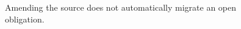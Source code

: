 \begin{figure}[H]
\centering
{}
\caption{Amending the source does not automatically migrate an open obligation.}\label{fig:teach-M07-11}
\end{figure}
